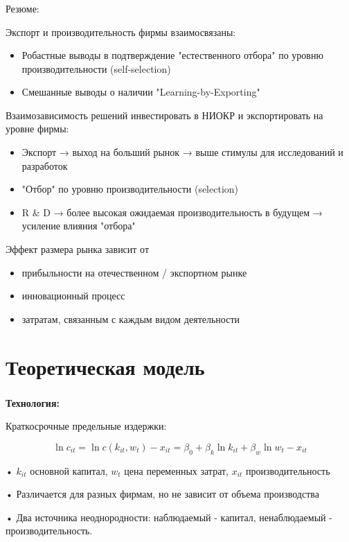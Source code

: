 \documentclass[c, dvipsnames]{beamer}  %
\begin{document}
\begin{frame}[shrink=3]
\frametitle{\insertsection} 


\begin{block}{Резюме:}
	
	
	
	Экспорт и производительность фирмы взаимосвязаны:
	\begin{itemize}
		\item  Робастные выводы в подтверждение "естественного отбора" по уровню производительности (self-selection)
		\item  Смешанные выводы о наличии "Learning-by-Exporting"
	\end{itemize} 
	
	
	Взаимозависимость решений инвестировать в НИОКР и экспортировать на уровне фирмы:
	\begin{itemize}
		\item  Экспорт → выход на больший рынок → выше стимулы для исследований и разработок
		\item  "Отбор" по уровню производительности (selection)
		\item R \& D → более высокая ожидаемая производительность в будущем → усиление влияния "отбора"
		
	\end{itemize}
	
	Эффект размера рынка зависит от
	\begin{itemize}
		\item   прибыльности на отечественном / экспортном рынке
		\item  инновационный процесс
		\item  затратам, связанным с каждым видом деятельности
	\end{itemize}
	
\end{block}




\end{frame}




\section{Теоретическая модель}


\begin{frame}[shrink=3]
\frametitle{\insertsection} 

\textbf{Технология:}

Краткосрочные предельные издержки:

$$\ln c_{it} = \ln c(k_{it},w_{t}) − x_{it} = \beta_0 + \beta_{k }\ln k_{it} +\beta_{w} \ln w_{t} − x_{it}$$

• $k_{it }$ основной капитал, $w_{t}$ цена переменных затрат, $x_{it}$ производительность 

• Различается для разных фирмам, но не зависит от объема производства

• Два источника неоднородности: наблюдаемый - капитал, ненаблюдаемый - производительность.

\end{frame}
\end{document}
